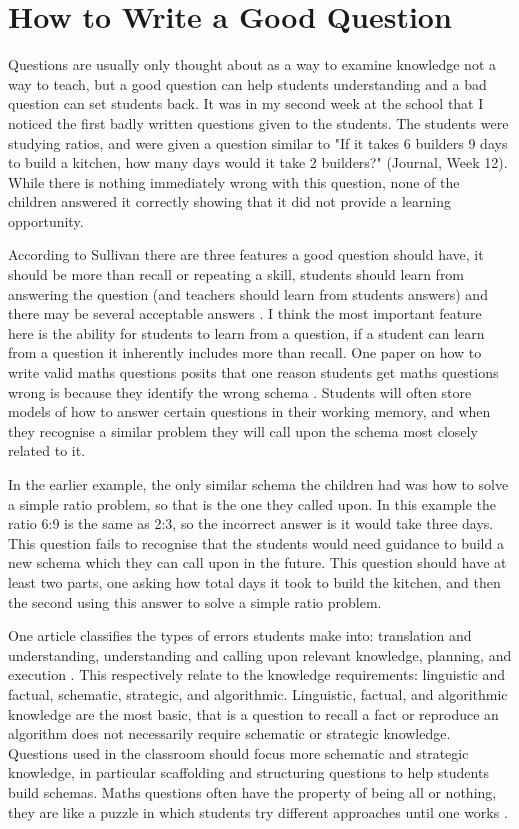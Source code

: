 \documentclass[11pt, a4paper, notitlepage]{article}
\begin{document}
\section*{How to Write a Good Question}
Questions are usually only thought about as a way to examine knowledge not a way to teach, but a good question can help students understanding and a bad question can set students back. It was in my second week at the school that I noticed the first badly written questions given to the students. The students were studying ratios, and were given a question similar to "If it takes 6 builders 9 days to build a kitchen, how many days would it take 2 builders?" (Journal, Week 12). While there is nothing immediately wrong with this question, none of the children answered it correctly showing that it did not provide a learning opportunity.
\par
According to Sullivan there are three features a good question should have, it should be more than recall or repeating a skill, students should learn from answering the question (and teachers should learn from students answers) and there may be several acceptable answers \cite{Sullivan:1997}. I think the most important feature here is the ability for students to learn from a question, if a student can learn from a question it inherently includes more than recall. One paper on how to write valid maths questions posits that one reason students get maths questions wrong is because they identify the wrong schema \cite{Pollitt:2002}. Students will often store models of how to answer certain questions in their working memory, and when they recognise a similar problem they will call upon the schema most closely related to it. 
\par
In the earlier example, the only similar schema the children had was how to solve a simple ratio problem, so that is the one they called upon. In this example the ratio 6:9 is the same as 2:3, so the incorrect answer is it would take three days. This question fails to recognise that the students would need guidance to build a new schema which they can call upon in the future. This question should have at least two parts, one asking how total days it took to build the kitchen, and then the second using this answer to solve a simple ratio problem.
\par
One article classifies the types of errors students make into: translation and understanding, understanding and calling upon relevant knowledge, planning, and execution \cite{Fisher:1996}. This respectively relate to the knowledge requirements: linguistic and factual, schematic, strategic, and algorithmic. Linguistic, factual, and algorithmic knowledge are the most basic, that is a question to recall a fact or reproduce an algorithm does not necessarily require schematic or strategic knowledge. Questions used in the classroom should focus more schematic and strategic knowledge, in particular scaffolding and structuring questions to help students build schemas. Maths questions often have the property of being all or nothing, they are like a puzzle in which students try different approaches until one works \cite{Pollitt:2002}. 
\end{document}
